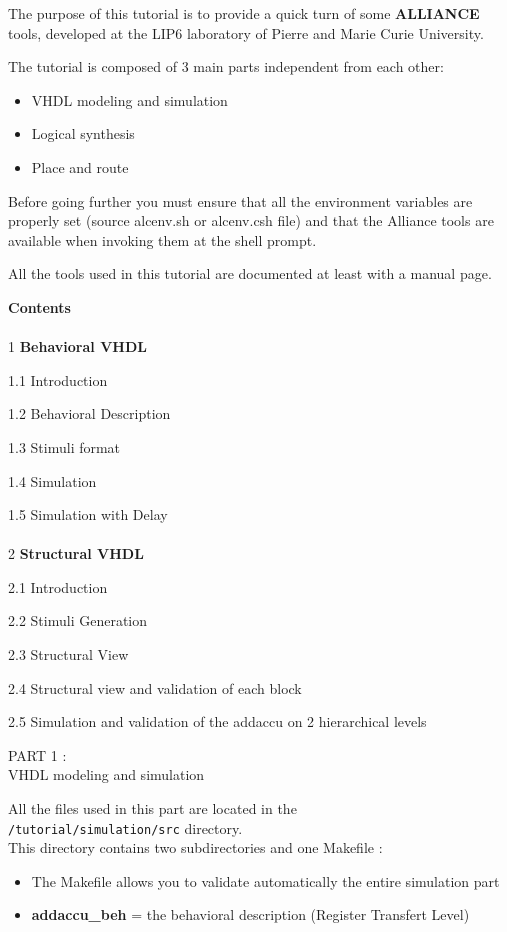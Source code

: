 \documentclass{article}
\begin{document}
\newpage
\large{ The purpose of this tutorial is to provide a quick turn of some { \bf
ALLIANCE } tools, developed at the LIP6 laboratory of Pierre and Marie Curie
University.

The tutorial is composed of 3 main parts independent from each other:

\begin{itemize}\itemsep=-.8ex
\item {VHDL modeling and simulation}
\item {Logical synthesis}
\item {Place and route}
\end{itemize}

Before going further you must ensure that all the environment variables are
properly set (source alcenv.sh or alcenv.csh file)
and that the Alliance tools are available when invoking them at the shell
prompt.

All the tools used in this tutorial are documented at least with a
manual page.

\newpage
{\bf Contents}\\
\\
{1} {\bf Behavioral VHDL}

{1.1} Introduction

{1.2} Behavioral Description

{1.3} Stimuli format

{1.4} Simulation

{1.5} Simulation with Delay\\
\\
{2} {\bf Structural VHDL}

{2.1} Introduction

{2.2} Stimuli Generation

{2.3} Structural View

{2.4} Structural view and validation of each block

{2.5} Simulation and validation of the addaccu on 2 hierarchical levels

\newpage
        {\huge
        PART 1 :\\ }
        \vspace{1cm}
        {\huge
        VHDL modeling and simulation
        }

All the files used in this part are located in the \\ 
\texttt{/tutorial/simulation/src} directory.\\
This directory contains two subdirectories and one Makefile : 
\begin{itemize}
\item The Makefile allows you to validate automatically the entire simulation part
\item {\bf addaccu\_beh} = the behavioral description (Register Transfert Level)


\end{itemize}}
\end{document}
